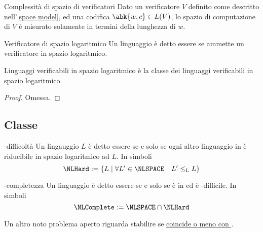 \documentclass[a4paper, 12pt]{report}
\begin{document}
    \begin{frameddefn}{Complessità di spazio di verificatori}
        Dato un verificatore $V$ definito come descritto nell'\cref{space model}, ed una codifica $\abk{w, c} \in L(V)$, lo spazio di computazione di $V$ è misurato solamente in termini della lunghezza di $w$.
    \end{frameddefn}

    \begin{frameddefn}{Verificatore di spazio logaritmico}
        Un linguaggio è detto essere  se ammette un verificatore in spazio logaritmico.
    \end{frameddefn}

    \begin{framedthm}[label={nl verif}]{Linguaggi verificabili in spazio logaritmico}
        \NLSPACE è la classe dei linguaggi verificabili in spazio logaritmico.
    \end{framedthm}

    \begin{proof}
        Omessa.
    \end{proof}

    \subsection{Classe \NLComplete}

    \begin{frameddefn}{\NLSPACE-difficoltà}
        Un lingauggio $L$ è detto essere  se e solo se ogni altro linguaggio in \NLSPACE è riducibile in spazio logaritmico ad $L$. In simboli $$\NLHard := \{L \mid \forall L' \in \NLSPACE \quad L' \leq_\mathrm L L\}$$
    \end{frameddefn}

    \begin{frameddefn}{\NLSPACE-completezza}
        Un linguaggio è detto essere  se e solo se è in \NLSPACE ed è \NLSPACE-difficile. In simboli $$\NLComplete := \NLSPACE \cap \NLHard$$
    \end{frameddefn}

    \begin{framedobs}{}
        Un altro noto problema aperto riguarda stabilire se \href{https://en.wikipedia.org/wiki/NL_(complexity)}{\LSPACE coincide o meno con \NLSPACE}.
    \end{framedobs}
\end{document}
